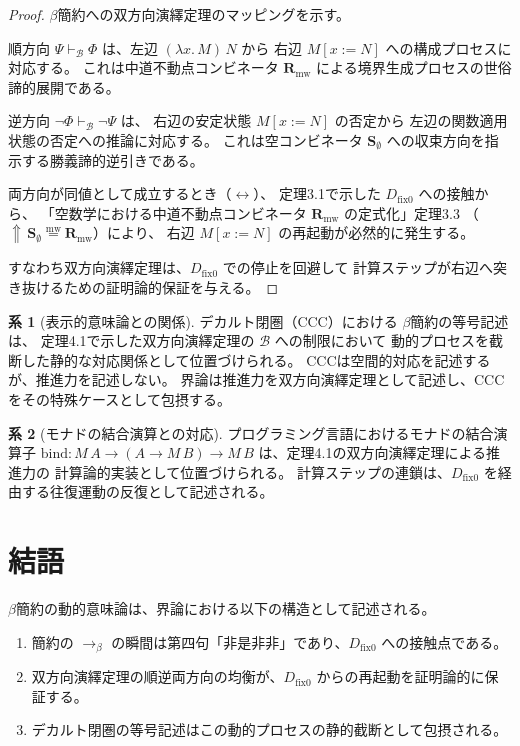 \documentclass[11pt,a4paper]{ltjsarticle}
\newcommand{\mweq}{\mathrel{\overset{\mathrm{mw}}{=}}}
\newcommand{\Rmw}{\mathbf{R}_{\mathrm{mw}}}
\newcommand{\Svoid}{\mathbf{S}_{\emptyset}}
\newcommand{\dfix}{D_{\mathrm{fix}0}}
\newcommand{\metanegation}{\Uparrow}
\newcommand{\Bval}{\mathcal{B}}
\theoremstyle{definition}
\newtheorem{corollary}{系}[section]
\begin{document}
\begin{proof}
$\beta$簡約への双方向演繹定理のマッピングを示す。

順方向 $\Psi \vdash_{\Bval} \Phi$ は、左辺 $(\lambda x.\, M)\, N$ から
右辺 $M[x := N]$ への構成プロセスに対応する。
これは中道不動点コンビネータ $\Rmw$ による境界生成プロセスの世俗諦的展開である。

逆方向 $\neg\Phi \vdash_{\Bval} \neg\Psi$ は、
右辺の安定状態 $M[x := N]$ の否定から
左辺の関数適用状態の否定への推論に対応する。
これは空コンビネータ $\Svoid$ への収束方向を指示する勝義諦的逆引きである。

両方向が同値として成立するとき（$\leftrightarrow$）、
定理3.1で示した $\dfix$ への接触から、
「空数学における中道不動点コンビネータ $\Rmw$ の定式化\cite{Chiba2026_Rmw}」定理3.3
（$\metanegation\,\Svoid \mweq \Rmw$）により、
右辺 $M[x := N]$ の再起動が必然的に発生する。

すなわち双方向演繹定理は、$\dfix$ での停止を回避して
計算ステップが右辺へ突き抜けるための証明論的保証を与える。
\end{proof}

\begin{corollary}[表示的意味論との関係]
デカルト閉圏（CCC）における $\beta$簡約の等号記述は、
定理4.1で示した双方向演繹定理の $\Bval$ への制限において
動的プロセスを截断した静的な対応関係として位置づけられる。
CCCは空間的対応を記述するが、推進力を記述しない。
界論は推進力を双方向演繹定理として記述し、CCCをその特殊ケースとして包摂する。
\end{corollary}

\begin{corollary}[モナドの結合演算との対応]
プログラミング言語におけるモナドの結合演算子
$\mathrm{bind} : M\,A \to (A \to M\,B) \to M\,B$
は、定理4.1の双方向演繹定理による推進力の
計算論的実装として位置づけられる。
計算ステップの連鎖は、$\dfix$ を経由する往復運動の反復として記述される。
\end{corollary}

\section{結語}

$\beta$簡約の動的意味論は、界論における以下の構造として記述される。

\begin{enumerate}
\item 簡約の $\to_\beta$ の瞬間は第四句「非是非非」であり、$\dfix$ への接触点である。
\item 双方向演繹定理の順逆両方向の均衡が、$\dfix$ からの再起動を証明論的に保証する。
\item デカルト閉圏の等号記述はこの動的プロセスの静的截断として包摂される。
\end{enumerate}
\end{document}
